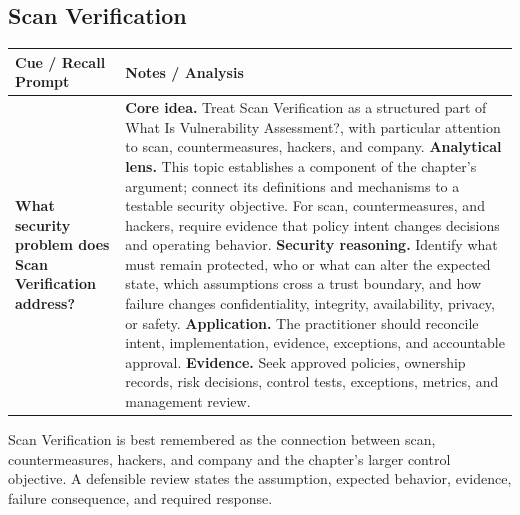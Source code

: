 \documentclass[11pt]{article}
\newcommand{\CornellHeader}{%
\rowcolor{Navy}\color{white}\bfseries Cue / Recall Prompt & \color{white}\bfseries Notes / Analysis\\\hline}
\newcommand{\CornellRow}[2]{%
\cellcolor{CueGray}\RaggedRight\textbf{#1} & \RaggedRight #2\\\hline}
\begin{document}
\subsection*{Scan Verification}
\begin{longtable}{>{\RaggedRight\arraybackslash}p{}|>{\RaggedRight\arraybackslash}p{}}
\CornellHeader
\CornellRow{What security problem does Scan Verification address?}{\textbf{Core idea.} Treat Scan Verification as a structured part of What Is Vulnerability Assessment?, with particular attention to scan, countermeasures, hackers, and company. \textbf{Analytical lens.} This topic establishes a component of the chapter's argument; connect its definitions and mechanisms to a testable security objective. For scan, countermeasures, and hackers, require evidence that policy intent changes decisions and operating behavior. \textbf{Security reasoning.} Identify what must remain protected, who or what can alter the expected state, which assumptions cross a trust boundary, and how failure changes confidentiality, integrity, availability, privacy, or safety. \textbf{Application.} The practitioner should reconcile intent, implementation, evidence, exceptions, and accountable approval. \textbf{Evidence.} Seek approved policies, ownership records, risk decisions, control tests, exceptions, metrics, and management review.}
\end{longtable}
\begin{topicsummary}
Scan Verification is best remembered as the connection between scan, countermeasures, hackers, and company and the chapter's larger control objective. A defensible review states the assumption, expected behavior, evidence, failure consequence, and required response.
\end{topicsummary}
\end{document}
